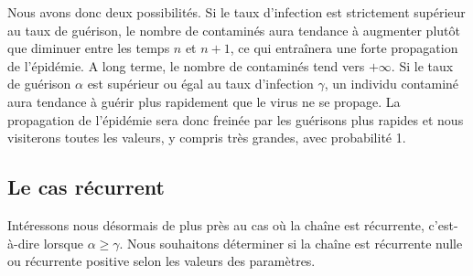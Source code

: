 \documentclass[12pt,a4paper]{report}
\theoremstyle{remark}
\begin{document}
Nous avons donc deux possibilités. Si le taux d'infection est strictement supérieur au taux de guérison, le nombre de contaminés aura tendance à augmenter plutôt que diminuer entre les temps $n$ et $n+1$, ce qui entraînera une forte propagation de l'épidémie. A long terme, le nombre de contaminés tend vers $+\infty$. Si le taux de guérison $\alpha$ est supérieur ou égal au taux  d'infection $\gamma$, un individu contaminé aura tendance à guérir plus rapidement que le virus ne se propage. La propagation de l'épidémie sera donc freinée par les guérisons plus rapides et nous visiterons toutes les valeurs, y compris très grandes, avec probabilité 1.
\\
\subsection{Le cas récurrent}
\vspace{0.6cm}

Intéressons nous désormais de plus près au cas où la chaîne est récurrente, c'est-à-dire lorsque $\alpha \geqslant \gamma$. Nous souhaitons déterminer si la chaîne est récurrente nulle ou récurrente positive selon les valeurs des paramètres.
\end{document}
